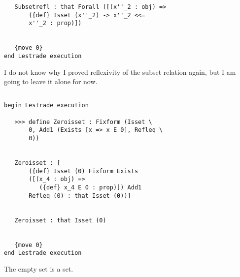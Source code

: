 \documentclass[12pt]{article}
\begin{document}
\begin{verbatim}
   Subsetrefl : that Forall ([(x''_2 : obj) => 
       ({def} Isset (x''_2) -> x''_2 <<= 
       x''_2 : prop)])


   {move 0}
end Lestrade execution
\end{verbatim}

I do not know why I proved reflexivity of the subset relation again, but I am going to leave it alone for now.

\begin{verbatim}

begin Lestrade execution

   >>> define Zeroisset : Fixform (Isset \
       0, Add1 (Exists [x => x E 0], Refleq \
       0))


   Zeroisset : [
       ({def} Isset (0) Fixform Exists 
       ([(x_4 : obj) => 
          ({def} x_4 E 0 : prop)]) Add1 
       Refleq (0) : that Isset (0))]


   Zeroisset : that Isset (0)


   {move 0}
end Lestrade execution
\end{verbatim}

The empty set is a set.
\end{document}
